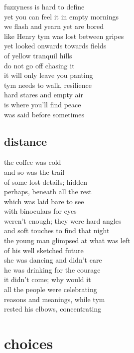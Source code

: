 \documentclass{article}
\begin{document}
fuzzyness is hard to define\\
yet you can feel it in empty mornings\\
we flash and yearn yet are bored\\
like Henry tym was lost between gripes\\
yet looked onwards towards fields\\
of yellow tranquil hills\\

do not go off chasing it\\
it will only leave you panting\\
tym needs to walk, resilience\\
hard stares and empty air\\
is where you'll find peace\\
was said before sometimes\\
\clearpage

\subsection{distance}

the coffee was cold\\
and so was the trail\\
of some lost details; hidden\\
perhaps, beneath all the rest\\
which was laid bare to see\\

with binoculars for eyes\\
weren't enough; they were hard angles\\
and soft touches to find that night\\
the young man glimpsed at what was left\\
of his well sketched future\\

she was dancing and didn't care\\
he was drinking for the courage\\
it didn't come; why would it\\
all the people were celebrating\\
reasons and meanings, while tym\\
rested his elbows, concentrating\\
\clearpage

\section{choices}
\end{document}
